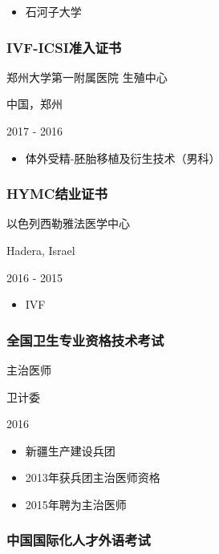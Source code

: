 \documentclass[]{article}
\providecommand{\tightlist}{%
  \setlength{\itemsep}{0pt}\setlength{\parskip}{0pt}}
\begin{document}
\begin{itemize}
\tightlist
\item
  石河子大学
\end{itemize}

\hypertarget{ivf-icsiux51c6ux5165ux8bc1ux4e66}{%
\subsubsection{IVF-ICSI准入证书}\label{ivf-icsiux51c6ux5165ux8bc1ux4e66}}

郑州大学第一附属医院 生殖中心

中国，郑州

2017 - 2016

\begin{itemize}
\tightlist
\item
  体外受精-胚胎移植及衍生技术（男科）
\end{itemize}

\hypertarget{hymcux7ed3ux4e1aux8bc1ux4e66}{%
\subsubsection{HYMC结业证书}\label{hymcux7ed3ux4e1aux8bc1ux4e66}}

以色列西勒雅法医学中心

Hadera, Israel

2016 - 2015

\begin{itemize}
\tightlist
\item
  IVF
\end{itemize}

\hypertarget{ux5168ux56fdux536bux751fux4e13ux4e1aux8d44ux683cux6280ux672fux8003ux8bd5}{%
\subsubsection{全国卫生专业资格技术考试}\label{ux5168ux56fdux536bux751fux4e13ux4e1aux8d44ux683cux6280ux672fux8003ux8bd5}}

主治医师

卫计委

2016

\begin{itemize}
\tightlist
\item
  新疆生产建设兵团
\item
  2013年获兵团主治医师资格
\item
  2015年聘为主治医师
\end{itemize}

\hypertarget{ux4e2dux56fdux56fdux9645ux5316ux4ebaux624dux5916ux8bedux8003ux8bd5}{%
\subsubsection{中国国际化人才外语考试}\label{ux4e2dux56fdux56fdux9645ux5316ux4ebaux624dux5916ux8bedux8003ux8bd5}}
\end{document}
